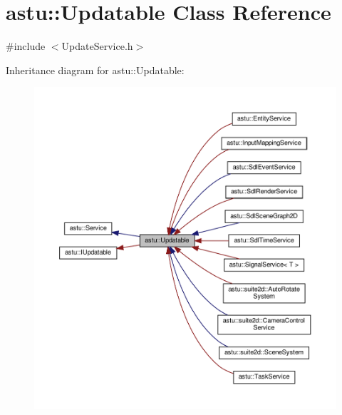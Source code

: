 \hypertarget{classastu_1_1Updatable}{}\section{astu\+:\+:Updatable Class Reference}
\label{classastu_1_1Updatable}


{\ttfamily \#include $<$Update\+Service.\+h$>$}



Inheritance diagram for astu\+:\+:Updatable\+:\nopagebreak
\begin{figure}[H]
\begin{center}
\leavevmode
\includegraphics[width=350pt]{classastu_1_1Updatable__inherit__graph}
\end{center}
\end{figure}


